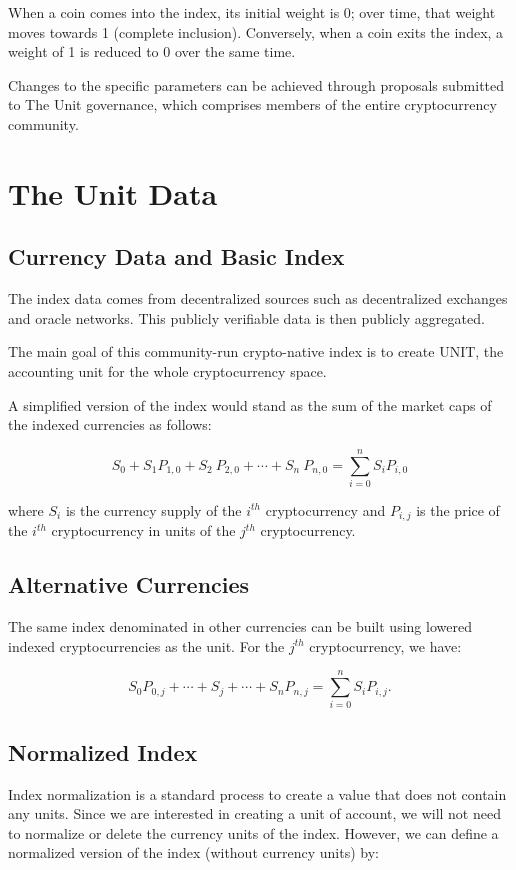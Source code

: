 \documentclass[12pt]{article}
\begin{document}
When a coin comes into the index, its initial weight is 0; over time, that weight moves towards 1 (complete inclusion). Conversely, when a coin exits the index, a weight of 1 is reduced to 0 over the same time.

Changes to the specific parameters can be achieved through proposals submitted to The Unit governance, which comprises members of the entire cryptocurrency community.

\section{The Unit Data}

\subsection{Currency Data and Basic Index}

The index data comes from decentralized sources such as decentralized exchanges and oracle networks. This publicly verifiable data is then publicly aggregated.

The main goal of this community-run crypto-native index is to create UNIT, the accounting unit for the whole cryptocurrency space. 

A simplified version of the index would stand as the sum of the market caps of the indexed currencies as follows: 

$$
S_0+S_1 P_{1,0}+ S_2\ P_{2,0}+\cdots+ S_n\ P_{n,0} = \sum_{i=0}^{n} S_iP_{i,0}
$$

where $S_i$ is the currency supply of the $i^{th}$ cryptocurrency and $P_{i,j}$ is the price of the $i^{th}$ cryptocurrency in units of the $j^{th}$ cryptocurrency.

\subsection{Alternative Currencies}

The same index denominated in other currencies can be built using lowered indexed cryptocurrencies as the unit. For the $j^{th}$ cryptocurrency, we have:

$$
S_0P_{0,j}+\cdots+S_j+\cdots+S_nP_{n,j} = \sum_{i=0}^{n} S_iP_{i,j}.
$$


\subsection{Normalized Index}

Index normalization is a standard process to create a value that does not contain any units. Since we are interested in creating a unit of account, we will not need to normalize or delete the currency units of the index. However, we can define a normalized version of the index (without currency units) by:
\end{document}
